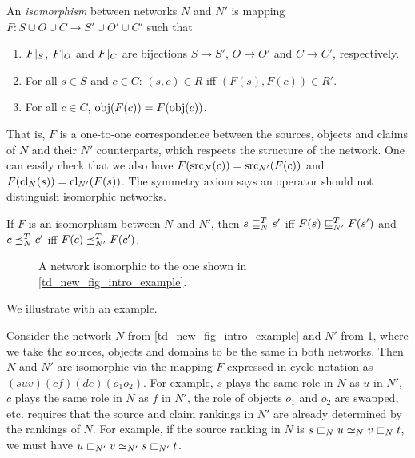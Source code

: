 \begin{definition}
    An \emph{isomorphism} between networks $N$ and $N'$ is mapping $F: S \cup O
    \cup C \to S' \cup O' \cup C'$ such that
    \begin{enumerate}
        \item $F|_{S}$, $F|_{O}$ and $F|_{C}$ are
              bijections $S \to S'$, $O \to O'$ and $C \to C'$, respectively.
        \item For all $s \in S$ and $c \in C$: $(s, c) \in R$ iff $(F(s), F(c))
              \in R'$.
        \item For all $c \in C$, $\operatorname{obj}(F(c)) = F(\operatorname{obj}(c))$.
    \end{enumerate}
\end{definition}

That is, $F$ is a one-to-one correspondence between the sources, objects and
claims of $N$ and their $N'$ counterparts, which respects the structure of the
network. One can easily check that we also have $F(\operatorname{src}_N(c)) =
\operatorname{src}_{N'}(F(c))$ and $F(\operatorname{cl}_N(s)) = \operatorname{cl}_{N'}(F(s))$.
%
The symmetry axiom says an operator should not distinguish isomorphic networks.

\begin{axiom}[\symmetry{}]
    If $F$ is an isomorphism between $N$ and $N'$, then
    $s \sqsubseteq_N^T s'$ iff $F(s) \sqsubseteq_{N'}^T F(s')$ and $c \preceq_N^T c'$ iff $F(c)
    \preceq_{N'}^T F(c')$.
\end{axiom}

\begin{figure}
    \centering
    \caption{
        A network isomorphic to the one shown in \cref{td_new_fig_intro_example}.
    }
    \label{td_new_fig_symmetry_example}
\end{figure}

We illustrate \symmetry{} with an example.

\begin{example}
    Consider the network $N$ from \cref{td_new_fig_intro_example} and $N'$ from
    \cref{td_new_fig_symmetry_example}, where we take the sources, objects and
    domains to be the same in both networks. Then $N$ and $N'$ are isomorphic
    via the mapping $F$ expressed in cycle notation as $(suv)(cf)(de)(o_1o_2)$.
    For example, $s$ plays the same role in $N$ as $u$ in $N'$, $c$ plays the
    same role in $N$ as $f$ in $N'$, the role of objects $o_1$ and $o_2$ are
    swapped, etc. \symmetry{} requires that the source and claim rankings in
    $N'$ are already determined by the rankings of $N$.  For example, if the
    source ranking in $N$ is $s \sqsubset_N u \simeq_N v \sqsubset_N t$, we must have $u
    \sqsubset_{N'} v \simeq_{N'} s \sqsubset_{N'} t$.
\end{example}

